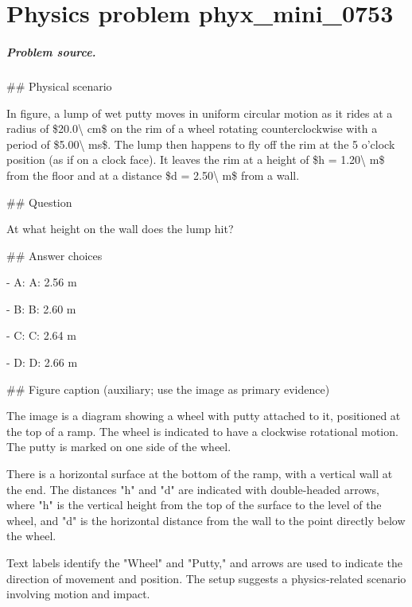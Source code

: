 
\chapter{Physics problem phyx\_mini\_0753}
\label{ch:PhyXMiniProblems_problem_phyx_mini_0753}

\paragraph{Problem source.}
\#\# Physical scenario

In figure, a lump of wet putty moves in uniform circular motion as it rides at a radius of \$20.0\textbackslash{} cm\$ on the rim of a wheel rotating counterclockwise with a period of \$5.00\textbackslash{} ms\$. The lump then happens to fly off the rim at the 5 o'clock position (as if on a clock face). It leaves the rim at a height of \$h = 1.20\textbackslash{} m\$ from the floor and at a distance \$d = 2.50\textbackslash{} m\$ from a wall.

\#\# Question

At what height on the wall does the lump hit?

\#\# Answer choices

- A: A: 2.56 m

- B: B: 2.60 m

- C: C: 2.64 m

- D: D: 2.66 m

\#\# Figure caption (auxiliary; use the image as primary evidence)

The image is a diagram showing a wheel with putty attached to it, positioned at the top of a ramp. The wheel is indicated to have a clockwise rotational motion. The putty is marked on one side of the wheel. 

There is a horizontal surface at the bottom of the ramp, with a vertical wall at the end. The distances "h" and "d" are indicated with double-headed arrows, where "h" is the vertical height from the top of the surface to the level of the wheel, and "d" is the horizontal distance from the wall to the point directly below the wheel. 

Text labels identify the "Wheel" and "Putty," and arrows are used to indicate the direction of movement and position. The setup suggests a physics-related scenario involving motion and impact.

